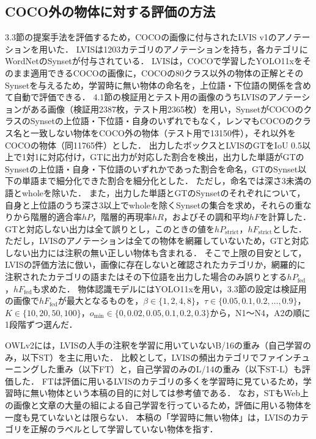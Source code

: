 \subsection{COCO外の物体に対する評価の方法}
3.3節の提案手法を評価するため，COCOの画像に付与されたLVIS v1\cite{ref_LVIS}のアノテーションを用いた．
LVISは1203カテゴリのアノテーションを持ち，各カテゴリにWordNetのSynsetが付与されている．
LVISは，COCOで学習したYOLO11xをそのまま適用できるCOCOの画像に，COCOの80クラス以外の物体の正解とそのSynsetを与えるため，学習時に無い物体の命名を，上位語・下位語の関係を含めて自動で評価できる．
4.1節の検証用とテスト用の画像のうちLVISのアノテーションがある画像（検証用2387枚，テスト用2365枚）を用い，SynsetがCOCOのクラスのSynsetの上位語・下位語・自身のいずれでもなく，レンマもCOCOのクラス名と一致しない物体をCOCO外の物体（テスト用で13150件），それ以外をCOCOの物体（同11765件）とした．
出力したボックスとLVISのGTをIoU 0.5以上で1対1に対応付け，GTに出力が対応した割合を検出，出力した単語がGTのSynsetの上位語・自身・下位語のいずれかであった割合を命名，GTのSynset以下の単語まで細分化できた割合を細分化とした．
ただし，命名では深さ3未満の語とwholeを除いた．
また，出力した単語とGTのSynsetのそれぞれについて，自身と上位語のうち深さ3以上でwholeを除くSynsetの集合を求め，それらの重なりから階層的適合率$ hP $，階層的再現率$ hR $，およびその調和平均$ hF $を計算した\cite{ref_hF}．
GTと対応しない出力は全て誤りとし，このときの値を$ hP_{\mathrm{strict}} $，$ hF_{\mathrm{strict}} $とした．
ただし，LVISのアノテーションは全ての物体を網羅していないため，GTと対応しない出力には注釈の無い正しい物体も含まれる．
そこで上限の目安として，LVISの評価方法に倣い，画像に存在しないと確認されたカテゴリか，網羅的に注釈されたカテゴリの語またはその下位語を出力した場合のみ誤りとする$ hP_{\mathrm{fed}} $，$ hF_{\mathrm{fed}} $も求めた．
物体認識モデルにはYOLO11xを用い，3.3節の設定は検証用の画像で$ hF_{\mathrm{fed}} $が最大となるものを，$ \beta \in \{1, 2, 4, 8\} $，$ \tau \in \{0.05, 0.1, 0.2, \ldots, 0.9\} $，$ K \in \{10, 20, 50, 100\} $，$ o_{\min} \in \{0, 0.02, 0.05, 0.1, 0.2, 0.3\} $から，N1〜N4，A2の順に1段階ずつ選んだ．

OWLv2には，LVISの人手の注釈を学習に用いていないB/16の重み（自己学習のみ，以下ST）を主に用いた．
比較として，LVISの頻出カテゴリでファインチューニングした重み（以下FT）と，自己学習のみのL/14の重み（以下ST-L）も評価した．
FTは評価に用いるLVISのカテゴリの多くを学習時に見ているため，学習時に無い物体という本稿の目的に対しては参考値である．
なお，STもWeb上の画像と文章の大量の組による自己学習を行っているため，評価に用いる物体を一度も見ていないとは限らない．
本稿の「学習時に無い物体」は，LVISのカテゴリを正解のラベルとして学習していない物体を指す．

